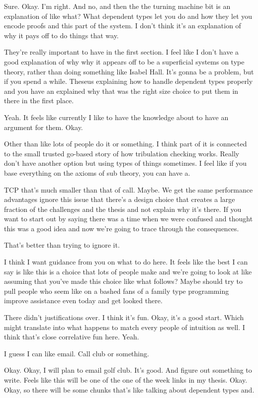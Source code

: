 \begin{subappendices}
Sure. Okay. I'm right. And no, and then the the turning machine bit is an explanation of like what? What dependent types let you do and how they let you encode proofs and this part of the system. I don't think it's an explanation of why it pays off to do things that way.

They're really important to have in the first section. I feel like I don't have a good explanation of why why it appears off to be a superficial systems on type theory, rather than doing something like Isabel Hall. It's gonna be a problem, but if you spend a while. Theseus explaining how to handle dependent types properly and you have an explained why that was the right size choice to put them in there in the first place.

Yeah. It feels like currently I like to have the knowledge about to have an argument for them. Okay.

Other than like lots of people do it or something. I think part of it is connected to the small trusted go-based story of how tribulation checking works. Really don't have another option but using types of things sometimes. I feel like if you base everything on the axioms of sub theory, you can have a.

TCP that's much smaller than that of call. Maybe. We get the same performance advantages ignore this issue that there's a design choice that creates a large fraction of the challenges and the thesis and not explain why it's there. If you want to start out by saying there was a time when we were confused and thought this was a good idea and now we're going to trace through the consequences.

That's better than trying to ignore it.

I think I want guidance from you on what to do here. It feels like the best I can say is like this is a choice that lots of people make and we're going to look at like assuming that you've made this choice like what follows? Maybe should try to pull people who seem like on a bashed fans of a family type programming improve assistance even today and get looked there.

There didn't justifications over. I think it's fun. Okay, it's a good start. Which might translate into what happens to match every people of intuition as well. I think that's close correlative fun here. Yeah.

I guess I can like email. Call club or something.

Okay. Okay, I will plan to email golf club. It's good. And figure out something to write. Feels like this will be one of the one of the week links in my thesis. Okay. Okay, so there will be some chunks that's like talking about dependent types and.


\end{subappendices}
